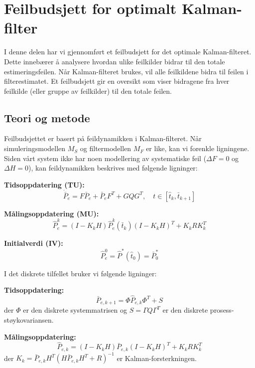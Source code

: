 \documentclass[a4paper,12pt]{article}
\theoremstyle{plain}
\begin{document}
\section{Feilbudsjett for optimalt Kalman-filter}

I denne delen har vi gjennomført et feilbudsjett for det optimale Kalman-filteret. Dette innebærer å analysere hvordan ulike feilkilder bidrar til den totale estimeringsfeilen. Når Kalman-filteret brukes, vil alle feilkildene bidra til feilen i filterestimatet. Et feilbudsjett gir en oversikt som viser bidragene fra hver feilkilde (eller gruppe av feilkilder) til den totale feilen.

\subsection{Teori og metode}

Feilbudsjettet er basert på feildynamikken i Kalman-filteret. Når simuleringsmodellen $M_S$ og filtermodellen $M_F$ er like, kan vi forenkle ligningene. Siden vårt system ikke har noen modellering av systematiske feil ($\Delta F = 0$ og $\Delta H = 0$), kan feildynamikken beskrives med følgende ligninger:

\textbf{Tidsoppdatering (TU):}
\begin{equation}
\dot{\bar{P}}_e = F\bar{P}_e + \bar{P}_eF^T + GQG^T, \quad t \in [\hat{t}_k, \bar{t}_{k+1}]
\end{equation}

\textbf{Målingsoppdatering (MU):}
\begin{equation}
\hat{P}_e^k = (I - K_kH)\hat{P}_e^k(\bar{t}_k)(I - K_kH)^T + K_kRK_k^T
\end{equation}

\textbf{Initialverdi (IV):}
\begin{equation}
\hat{P}_e^0 = \hat{P}^*(\hat{t}_0) = \bar{P}^*_0
\end{equation}

I det diskrete tilfellet bruker vi følgende ligninger:

\textbf{Tidsoppdatering:}
\begin{equation}
\bar{P}_{e,k+1} = \Phi \hat{P}_{e,k} \Phi^T + S
\end{equation}
der $\Phi$ er den diskrete systemmatrisen og $S = \Gamma Q \Gamma^T$ er den diskrete prosess-støykovariansen.

\textbf{Målingsoppdatering:}
\begin{equation}
\hat{P}_{e,k} = (I - K_kH)\bar{P}_{e,k}(I - K_kH)^T + K_kRK_k^T
\end{equation}
der $K_k = \bar{P}_{e,k}H^T(H\bar{P}_{e,k}H^T + R)^{-1}$ er Kalman-forsterkningen.
\end{document}
